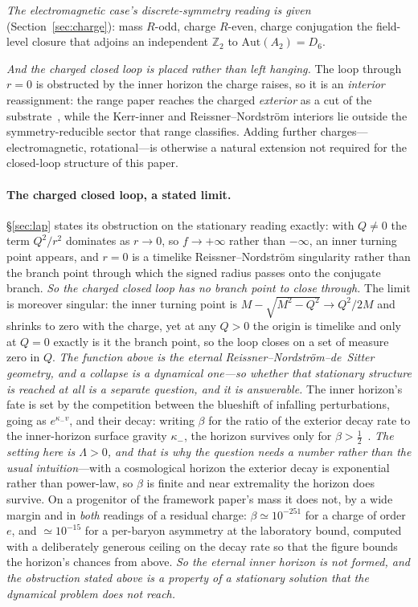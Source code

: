 \documentclass[11pt,a4paper]{article}
\theoremstyle{definition}
\begin{document}
\emph{The electromagnetic case's discrete-symmetry reading is given} (Section~\ref{sec:charge}): mass
$R$-odd, charge $R$-even, charge conjugation the field-level closure that adjoins an independent
$\mathbb{Z}_{2}$ to $\mathrm{Aut}(A_{2})=D_{6}$.

\emph{And the charged closed loop is placed rather than left hanging.} The loop through $r=0$ is
obstructed by the inner horizon the charge raises, so it is an \emph{interior} reassignment: the range
paper reaches the charged \emph{exterior} as a cut of the substrate~\cite{JanzenRange}, while the
Kerr-inner and Reissner--Nordstr\"om interiors lie outside the symmetry-reducible sector that range
classifies. Adding further charges---electromagnetic, rotational---is otherwise a natural extension not
required for the closed-loop structure of this paper.

\paragraph{The charged closed loop, a stated limit.} \S\ref{sec:lap} states its obstruction on the stationary reading exactly: with
$Q\neq0$ the term $Q^{2}/r^{2}$ dominates as $r\to0$, so $f\to+\infty$ rather than $-\infty$, an inner
turning point appears, and $r=0$ is a timelike Reissner--Nordstr\"om singularity rather than the branch
point through which the signed radius passes onto the conjugate branch. \emph{So the charged closed loop
has no branch point to close through.} The limit is moreover singular: the inner turning point is
$M-\sqrt{M^{2}-Q^{2}}\to Q^{2}/2M$ and shrinks to zero with the charge, yet at any $Q>0$ the origin is
timelike and only at $Q=0$ exactly is it the branch point, so the loop closes on a set of measure zero in
$Q$. \emph{The function above is the \emph{eternal} Reissner--Nordstr\"om--de~Sitter geometry, and a collapse
is a dynamical one---so whether that stationary structure is reached at all is a separate question, and
it is answerable.} The inner horizon's fate is set by the competition between the blueshift of infalling
perturbations, going as $e^{\kappa_{-}v}$, and their decay: writing $\beta$ for the ratio of the exterior
decay rate to the inner-horizon surface gravity $\kappa_{-}$, the horizon survives only for
$\beta>\tfrac12$~\cite{Cardoso2018}. \emph{The setting here is $\Lambda>0$, and that is why the question needs a number
rather than the usual intuition}---with a cosmological horizon the exterior decay is exponential rather
than power-law, so $\beta$ is finite and near extremality the horizon does survive. On a progenitor of
the framework paper's mass it does not, by a wide margin and in \emph{both} readings of a residual
charge: $\beta\simeq10^{-251}$ for a charge of order $e$, and $\simeq10^{-15}$ for a per-baryon asymmetry
at the laboratory bound, computed with a deliberately generous ceiling on the decay rate so that the
figure bounds the horizon's chances from
above. \emph{So the eternal inner
horizon is not formed, and the obstruction stated above is a property of a stationary solution that the
dynamical problem does not reach.}
\end{document}
